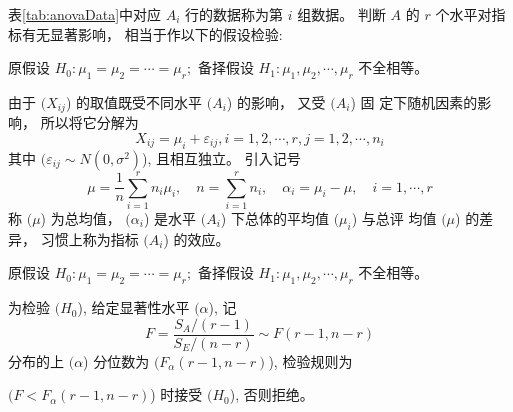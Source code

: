 表\cref{tab:anovaData}中对应 $A_{i}$ 行的数据称为第 $i$ 组数据。 判断 ${A}$ 的 ${r}$ 个水平对指标有无显著影响， 相当于作以下的假设检验:

原假设 $H_{0}: \mu_{1}=\mu_{2}=\cdots=\mu_{r} ;$
备择假设 ${H}_{1}: \mu_{1}, \mu_{2}, \cdots, \mu_{r}$ 不全相等。 

由于 $( X_{i j} $) 的取值既受不同水平 $( A_{i} $) 的影响， 又受 $( A_{i} $) 固 定下随机因素的影响， 所以将它分解为
\begin{equation}
X_{i j}=\mu_{i}+\varepsilon_{i j}, i=1,2, \cdots, r, j=1,2, \cdots, n_{i}\label{eq:anovaDecomposition}
\end{equation}
其中 $( \varepsilon_{i j} \sim N\left({0}, \sigma^{2}\right) $), 且相互独立。 引入记号
\begin{equation}
\mu=\frac{1}{n} \sum_{i=1}^{r} n_{i} \mu_{i}, \quad n=\sum_{i=1}^{r} n_{i}, \quad \alpha_{i}=\mu_{i}-\mu, \quad i=1, \cdots, r
\end{equation}
称 $( \mu $) 为总均值， $( \alpha_{i} $) 是水平 $( A_{i} $) 下总体的平均值 $( \mu_{i} $) 与总评
均值 $( \mu $) 的差异， 习惯上称为指标 $( {A}_{i} $) 的效应。 

\begin{definition}
原假设 $H_{0}: \mu_{1}=\mu_{2}=\cdots=\mu_{r} ;$
备择假设 ${H}_{1}: \mu_{1}, \mu_{2}, \cdots, \mu_{r}$ 不全相等。 

为检验 $( {H}_{0} $), 给定显著性水平 $( \alpha $), 记 \[ {F}=\frac{S_{A} /(r-1)}{S_{E} /(n-r)} \sim F(r-1, n-r) \] 分布的上 $( \alpha $) 分位数为 $( {F}_{\alpha}({r}-{1}, {n}-{r}) $), 检验规则为

$( {F}<{F}_{\alpha}({r}-{1}, {n}-{r}) $) 时接受 $( {H}_{{0}} $), 否则拒绝。 
\end{definition}

